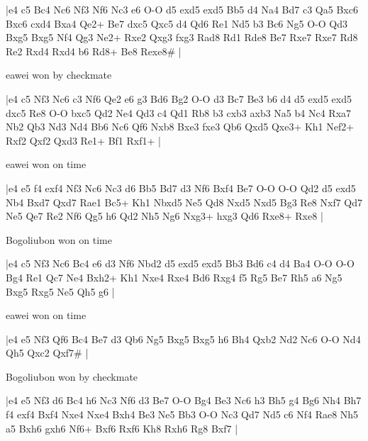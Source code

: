 \makegametitle
|e4 c5 Bc4 Nc6 Nf3 Nf6 Nc3 e6 O-O d5 exd5 exd5 Bb5 d4 Na4 Bd7 c3 Qa5 Bxc6 Bxc6 cxd4 Bxa4 Qe2+ Be7 dxc5 Qxc5 d4 Qd6 Re1 Nd5 b3 Bc6 Ng5 O-O Qd3 Bxg5 Bxg5 Nf4 Qg3 Ne2+ Rxe2 Qxg3 fxg3 Rad8 Rd1 Rde8 Be7 Rxe7 Rxe7 Rd8 Re2 Rxd4 Rxd4 b6 Rd8+ Be8 Rexe8\#  |

\showboard

eawei won by checkmate

\makegametitle
|e4 c5 Nf3 Nc6 c3 Nf6 Qe2 e6 g3 Bd6 Bg2 O-O d3 Bc7 Be3 b6 d4 d5 exd5 exd5 dxc5 Re8 O-O bxc5 Qd2 Ne4 Qd3 c4 Qd1 Rb8 b3 cxb3 axb3 Na5 b4 Nc4 Rxa7 Nb2 Qb3 Nd3 Nd4 Bb6 Nc6 Qf6 Nxb8 Bxe3 fxe3 Qb6 Qxd5 Qxe3+ Kh1 Nef2+ Rxf2 Qxf2 Qxd3 Re1+ Bf1 Rxf1+  |

\showboard

eawei won on time

\makegametitle
|e4 e5 f4 exf4 Nf3 Nc6 Nc3 d6 Bb5 Bd7 d3 Nf6 Bxf4 Be7 O-O O-O Qd2 d5 exd5 Nb4 Bxd7 Qxd7 Rae1 Bc5+ Kh1 Nbxd5 Ne5 Qd8 Nxd5 Nxd5 Bg3 Re8 Nxf7 Qd7 Ne5 Qe7 Re2 Nf6 Qg5 h6 Qd2 Nh5 Ng6 Nxg3+ hxg3 Qd6 Rxe8+ Rxe8  |

\showboard

Bogoliubon won on time

\makegametitle
|e4 c5 Nf3 Nc6 Bc4 e6 d3 Nf6 Nbd2 d5 exd5 exd5 Bb3 Bd6 c4 d4 Ba4 O-O O-O Bg4 Re1 Qc7 Ne4 Bxh2+ Kh1 Nxe4 Rxe4 Bd6 Rxg4 f5 Rg5 Be7 Rh5 a6 Ng5 Bxg5 Rxg5 Ne5 Qh5 g6  |

\showboard

eawei won on time

\makegametitle
|e4 e5 Nf3 Qf6 Bc4 Be7 d3 Qb6 Ng5 Bxg5 Bxg5 h6 Bh4 Qxb2 Nd2 Nc6 O-O Nd4 Qh5 Qxc2 Qxf7\#  |

\showboard

Bogoliubon won by checkmate

\makegametitle
|e4 e5 Nf3 d6 Bc4 h6 Nc3 Nf6 d3 Be7 O-O Bg4 Be3 Nc6 h3 Bh5 g4 Bg6 Nh4 Bh7 f4 exf4 Bxf4 Nxe4 Nxe4 Bxh4 Be3 Ne5 Bb3 O-O Nc3 Qd7 Nd5 c6 Nf4 Rae8 Nh5 a5 Bxh6 gxh6 Nf6+ Bxf6 Rxf6 Kh8 Rxh6 Rg8 Bxf7  |

\showboard

